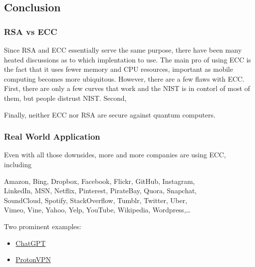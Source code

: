 \documentclass{article}
\begin{document}

\subsection*{Conclusion}

    \subsubsection*{RSA vs ECC}

    Since RSA and ECC essentially serve the same purpose, there have been many heated discussions as to which implentation to use. The main pro of using ECC is the fact that it uses fewer memory and CPU resources, important as mobile computing becomes more ubiquitous. However, there are a few flaws with ECC. First, there are only a few curves that work and the NIST is in contorl of most of them, but people distrust NIST. Second, 

    \vspace{2mm}
    Finally, neither ECC nor RSA are secure against quantum computers. 



    \subsubsection*{Real World Application}

    Even with all those downsides, more and more companies are using ECC, including

    \begin{center}
        Amazon, Bing, Dropbox, Facebook, Flickr, GitHub, Instagram, \\
        LinkedIn, MSN, Netflix, Pinterest, PirateBay, Quora, Snapchat, \\
        SoundCloud, Spotify, StackOverflow, Tumblr, Twitter, Uber, \\
        Vimeo, Vine, Yahoo, Yelp, YouTube, Wikipedia, Wordpress,\dots
    \end{center}

Two prominent examples:
    \begin{itemize}
        \item \href{https://chat.openai.com/chat}{ChatGPT}
        \item \href{https://proton.me/blog/elliptic-curve-cryptography}{ProtonVPN}
    \end{itemize}
\end{document}
